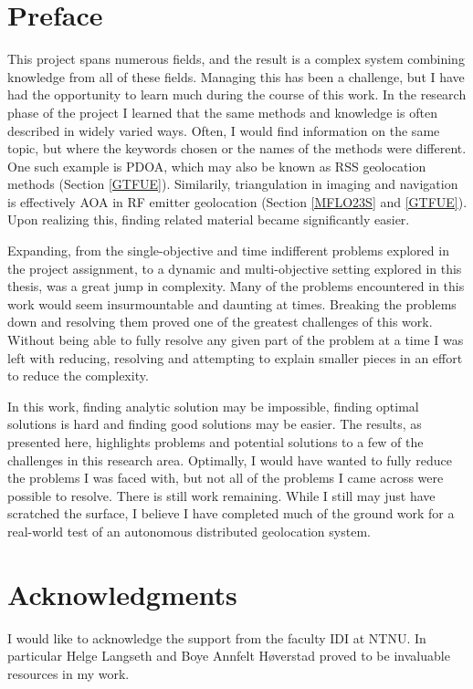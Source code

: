 \documentclass[10pt,a4paper]{book}
\begin{document}
\chapter*{Preface}
This project spans numerous fields, and the result is a complex system combining knowledge from all of these fields. Managing this has been a challenge, but I have had the opportunity to learn much during the course of this work. In the research phase of the project I learned that the same methods and knowledge is often described in widely varied ways. Often, I would find information on the same topic, but where the keywords chosen or the names of the methods were different. One such example is \gls{PDOA}, which may also be known as \gls{RSS} geolocation methods (Section \ref{GTFUE}). Similarily, triangulation in imaging and navigation is effectively \gls{AOA} in \gls{RF} emitter geolocation (Section \ref{MFLO23S} and \ref{GTFUE}). Upon realizing this, finding related material became significantly easier.

Expanding, from the single-objective and time indifferent problems explored in the project assignment, to a dynamic and multi-objective setting explored in this thesis, was a great jump in complexity. Many of the problems encountered in this work would seem insurmountable and daunting at times. Breaking the problems down and resolving them proved one of the greatest challenges of this work. Without being able to fully resolve any given part of the problem at a time I was left with reducing, resolving and attempting to explain smaller pieces in an effort to reduce the complexity. 

In this work, finding analytic solution may be impossible, finding optimal solutions is hard and finding good solutions may be easier. The results, as presented here, highlights problems and potential solutions to a few of the challenges in this research area. Optimally, I would have wanted to fully reduce the problems I was faced with, but not all of the problems I came across were possible to resolve. There is still work remaining. While I still may just have scratched the surface, I believe I have completed much of the ground work for a real-world test of an autonomous distributed geolocation system. 


\chapter*{Acknowledgments}


I would like to acknowledge the support from the faculty IDI at NTNU. In particular Helge Langseth and Boye Annfelt Høverstad proved to be invaluable resources in my work. 
\end{document}

